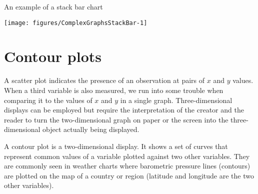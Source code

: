 \begin{exhibit} 
\begin{center} 
\caption{An example of a stack bar chart} 
\label{StackBarChart} 
\begin{knitrout}
\color{fgcolor}\begin{kframe}
\begin{alltt}
\hlstd{> }\hlstd{(}  \hlstd{=}\hlstd{(}\hlstd{,}\hlstd{),} \hlstd{=}\hlstd{)}
\hlstd{> }\hlstd{(}\hlstd{,} \hlstd{=}\hlstd{,} \hlstd{=}\hlstd{)}
\end{alltt}
\end{kframe}
\texttt{[image: figures/ComplexGraphsStackBar-1]} 

\end{knitrout}
\end{center} 
\end{exhibit} 
 
 
 
\section{Contour plots} 
 
A scatter plot indicates the presence of an observation at pairs of $x$ and $y$ values. When a third variable is also measured, we run into some trouble when comparing it to the values of $x$ and $y$ in a single graph. Three-dimensional displays can be employed but require the interpretation of the creator and the reader to turn the two-dimensional graph on paper or the screen into the three-dimensional object actually being displayed. 
 
A contour plot is a two-dimensional display. It shows a set of curves that represent common values of a variable plotted against two other variables. They are commonly seen in weather charts where barometric pressure lines (contours) are plotted on the map of a country or region (latitude and longitude are the two other variables). 
 
